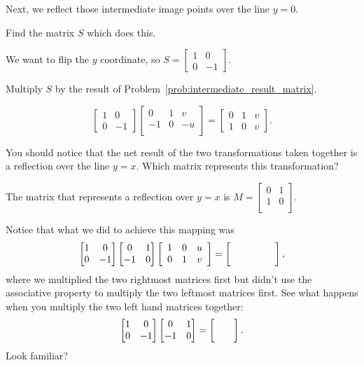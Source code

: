 \documentclass[../gatm_answers.tex]{subfiles}
\begin{document}
\begin{inner_problem}
\item Next, we reflect those intermediate image points over the line $y=0$.
\end{inner_problem}

\begin{iinner_problem}[start=1]
\item Find the matrix $S$ which does this.
\end{iinner_problem}

We want to flip the $y$ coordinate, so $S=\begin{bmatrix} 1 & 0 \\ 0 & -1 \end{bmatrix}$.

\begin{iinner_problem}
\item Multiply $S$ by the result of Problem~\ref{prob:intermediate_result_matrix}.
\end{iinner_problem}

$$\begin{bmatrix} 1 & 0 \\ 0 & -1 \end{bmatrix} \begin{bmatrix}0 & 1 & v \\ -1 & 0 & -u \\ \end{bmatrix}=\begin{bmatrix} 0 & 1 & v \\ 1 & 0 & v \end{bmatrix}.$$

\begin{inner_problem}
\item You should notice that the net result of the two transformations taken together is a reflection over the line $y=x$. Which matrix represents this transformation?
\end{inner_problem}

The matrix that represents a reflection over $y=x$ is $M=\begin{bmatrix} 0 & 1 \\ 1 & 0 \\ \end{bmatrix}$.

\begin{inner_problem}
\item Notice that what we did to achieve this mapping was $$\twomat{1}{0}{0}{-1}\twomat{0}{1}{-1}{0}\left[\begin{array}{ccc} 1 & 0 & u \\ 0 & 1 & v \end{array}\right]=\left[\phantom{\begin{array}{ccc} 1 & 0 & u \\ 0 & 1 & v \end{array}}\right],$$
where we multiplied the two rightmost matrices first but didn't use the associative property to multiply the two leftmost matrices first. See what happens when you multiply the two left hand matrices together: $$\twomat{1}{0}{0}{-1}\twomat{0}{1}{-1}{0}=\blanktwomat.$$ Look familiar?
\end{inner_problem}
\end{document}
